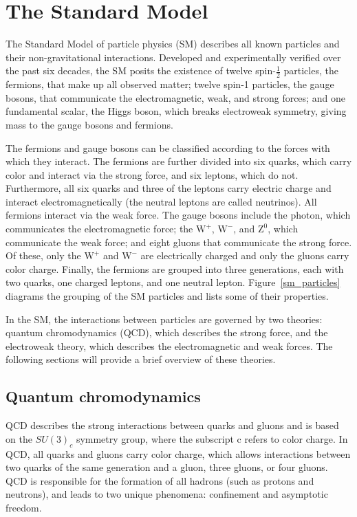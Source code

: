 \section{The Standard Model}
The Standard Model of particle physics (SM) describes all known particles and their non-gravitational interactions. Developed and experimentally verified over the past six decades, the SM posits the existence of twelve spin-$\frac{1}{2}$ particles, the fermions, that make up all observed matter; twelve spin-1 particles, the gauge bosons, that communicate the electromagnetic, weak, and strong forces; and one fundamental scalar, the Higgs boson, which breaks electroweak symmetry, giving mass to the gauge bosons and fermions.

The fermions and gauge bosons can be classified according to the forces with which they interact. The fermions are further divided into six quarks, which carry color and interact via the strong force, and six leptons, which do not. Furthermore, all six quarks and three of the leptons carry electric charge and interact electromagnetically (the neutral leptons are called neutrinos). All fermions interact via the weak force. The gauge bosons include the photon, which communicates the electromagnetic force; the $\mathrm{W}^+$, $\mathrm{W}^-$, and $\mathrm{Z^0}$, which communicate the weak force; and eight gluons that communicate the strong force. Of these, only the $\mathrm{W}^+$ and $\mathrm{W}^-$ are electrically charged and only the gluons carry color charge. Finally, the fermions are grouped into three generations, each with two quarks, one charged leptons, and one neutral lepton. Figure~\ref{sm_particles} diagrams the grouping of the SM particles and lists some of their properties.



In the SM, the interactions between particles are governed by two theories: quantum chromodynamics (QCD), which describes the strong force, and the electroweak theory, which describes the electromagnetic and weak forces. The following sections will provide a brief overview of these theories.

\subsection{Quantum chromodynamics}
QCD describes the strong interactions between quarks and gluons and is based on the $SU(3)_{c}$ symmetry group, where the subscript c refers to color charge. In QCD, all quarks and gluons carry color charge, which allows interactions between two quarks of the same generation and a gluon, three gluons, or four gluons. QCD is responsible for the formation of all hadrons (such as protons and neutrons), and leads to two unique phenomena: confinement and asymptotic freedom. 

